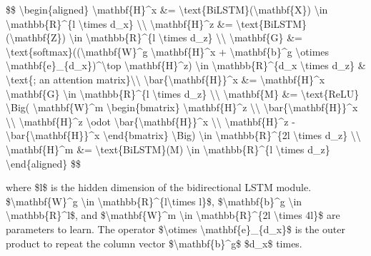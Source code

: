 \$\$ \textbackslash begin\{aligned\} \textbackslash mathbf\{H\}\^{}x \&= \textbackslash text\{BiLSTM\}(\textbackslash mathbf\{X\}) \textbackslash in \textbackslash mathbb\{R\}\^{}\{l \textbackslash times d\_x\} \textbackslash\textbackslash{} \textbackslash mathbf\{H\}\^{}z \&= \textbackslash text\{BiLSTM\}(\textbackslash mathbf\{Z\}) \textbackslash in \textbackslash mathbb\{R\}\^{}\{l \textbackslash times d\_z\} \textbackslash\textbackslash{} \textbackslash mathbf\{G\} \&= \textbackslash text\{softmax\}((\textbackslash mathbf\{W\}\^{}g \textbackslash mathbf\{H\}\^{}x + \textbackslash mathbf\{b\}\^{}g \textbackslash otimes \textbackslash mathbf\{e\}\_\{d\_x\})\^{}\textbackslash top \textbackslash mathbf\{H\}\^{}z) \textbackslash in \textbackslash mathbb\{R\}\^{}\{d\_x \textbackslash times d\_z\} \& \textbackslash text\{; an attention matrix\}\textbackslash\textbackslash{} \textbackslash bar\{\textbackslash mathbf\{H\}\}\^{}x \&= \textbackslash mathbf\{H\}\^{}x \textbackslash mathbf\{G\} \textbackslash in \textbackslash mathbb\{R\}\^{}\{l \textbackslash times d\_z\} \textbackslash\textbackslash{} \textbackslash mathbf\{M\} \&= \textbackslash text\{ReLU\} \textbackslash Big( \textbackslash mathbf\{W\}\^{}m \textbackslash begin\{bmatrix\} \textbackslash mathbf\{H\}\^{}z \textbackslash\textbackslash{} \textbackslash bar\{\textbackslash mathbf\{H\}\}\^{}x \textbackslash\textbackslash{} \textbackslash mathbf\{H\}\^{}z \textbackslash odot \textbackslash bar\{\textbackslash mathbf\{H\}\}\^{}x \textbackslash\textbackslash{} \textbackslash mathbf\{H\}\^{}z - \textbackslash bar\{\textbackslash mathbf\{H\}\}\^{}x \textbackslash end\{bmatrix\} \textbackslash Big) \textbackslash in \textbackslash mathbb\{R\}\^{}\{2l \textbackslash times d\_z\} \textbackslash\textbackslash{} \textbackslash mathbf\{H\}\^{}m \&= \textbackslash text\{BiLSTM\}(M) \textbackslash in \textbackslash mathbb\{R\}\^{}\{l \textbackslash times d\_z\} \textbackslash end\{aligned\} \$\$

where \$l\$ is the hidden dimension of the bidirectional LSTM module. \$\textbackslash mathbf\{W\}\^{}g \textbackslash in \textbackslash mathbb\{R\}\^{}\{l\textbackslash times l\}\$, \$\textbackslash mathbf\{b\}\^{}g \textbackslash in \textbackslash mathbb\{R\}\^{}l\$, and \$\textbackslash mathbf\{W\}\^{}m \textbackslash in \textbackslash mathbb\{R\}\^{}\{2l \textbackslash times 4l\}\$ are parameters to learn. The operator \$\textbackslash otimes \textbackslash mathbf\{e\}\_\{d\_x\}\$ is the outer product to repeat the column vector \$\textbackslash mathbf\{b\}\^{}g\$ \$d\_x\$ times.


